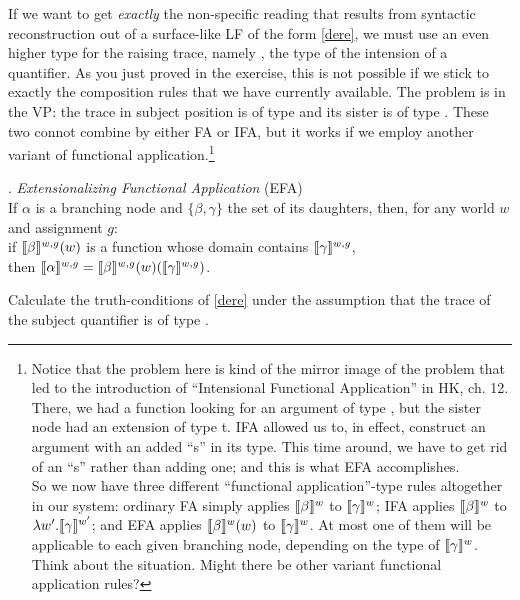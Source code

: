 If we want to get \emph{exactly} the non-specific reading that results from syntactic reconstruction out of a surface-like LF of the form \ref{dere}, we must use an even higher type for the raising trace, namely , the type of the intension of a quantifier. As you just proved in the exercise, this is not possible if we stick to exactly the composition rules that we have currently available. The problem is in the VP: the trace in subject position is of type  and its sister is of type . These two connot combine by either FA or IFA, but it works if we employ another variant of functional application.\footnote{Notice that the problem here is kind of the mirror image of the problem that led to the introduction of ``Intensional Functional Application'' in H\amp K, ch. 12. There, we had a function looking for an argument of type , but the sister node had an extension of type t. IFA allowed us to, in effect, construct an argument with an added ``s'' in its type. This time around, we have to get rid of an ``s'' rather than adding one; and this is what EFA accomplishes. \\
\indent So we now have three different ``functional application''-type rules altogether in our system: ordinary FA simply applies $\llbracket \beta \rrbracket^w$ to $\llbracket \gamma \rrbracket^w$; IFA applies $\llbracket \beta \rrbracket^w$ to $\lambda w'.\llbracket \gamma \rrbracket^{w'}$; and EFA applies $\llbracket \beta \rrbracket^w(w)$ to $\llbracket \gamma \rrbracket^w$. At most one of them will be applicable to each given branching node, depending on the type of $\llbracket \gamma \rrbracket^w$.\\
\indent Think about the situation. Might there be other variant functional application rules?}

\ex. \emph{Extensionalizing Functional Application} (EFA)\\
If $\alpha$ is a branching node and $\{\beta,\gamma\}$ the set of its daughters, then, for any world $w$ and assignment $g$: \\
if $\llbracket \beta \rrbracket^{w,g}(w)$ is a function whose domain contains $\llbracket \gamma \rrbracket^{w,g}$,\\
then $\llbracket \alpha \rrbracket^{w,g} = \llbracket \beta \rrbracket^{w,g}(w)(\llbracket \gamma \rrbracket^{w,g})$.

\begin{exercise}
	
	Calculate the truth-conditions of \ref{dere} under the assumption that the trace of the subject quantifier is of type . \eex 
\end{exercise}

